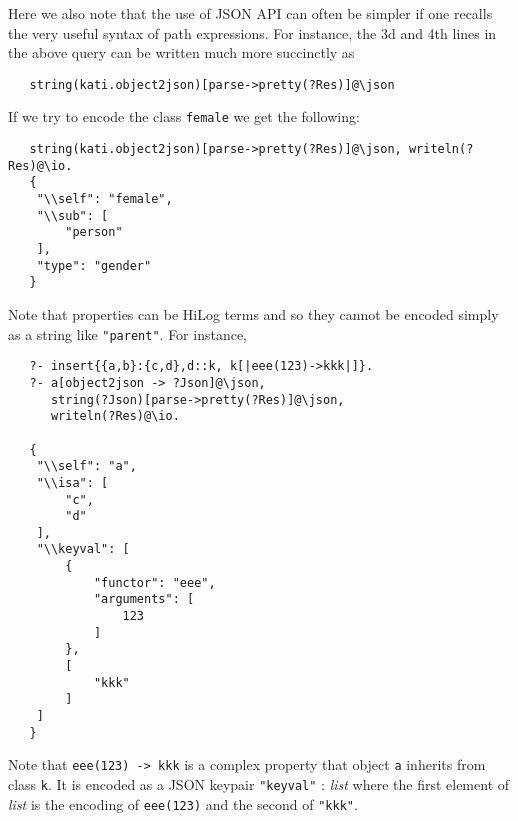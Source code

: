 Here we also note that the use of JSON API can often be simpler if one
recalls the very useful syntax of path expressions. For instance, the 3d
and 4th lines in the above query can be written much more succinctly as
\begin{verbatim}
   string(kati.object2json)[parse->pretty(?Res)]@\json
\end{verbatim}
If we try to encode the class \texttt{female} we get the following:
\begin{verbatim}
   string(kati.object2json)[parse->pretty(?Res)]@\json, writeln(?Res)@\io.
   {
    "\\self": "female",
    "\\sub": [
        "person"
    ],
    "type": "gender"
   }
\end{verbatim}
Note that \ERGO properties can be HiLog terms and so they cannot be
encoded simply as a string like \texttt{"parent"}. For instance,
\begin{verbatim}
   ?- insert{{a,b}:{c,d},d::k, k[|eee(123)->kkk|]}.
   ?- a[object2json -> ?Json]@\json,
      string(?Json)[parse->pretty(?Res)]@\json,
      writeln(?Res)@\io.

   {
    "\\self": "a",
    "\\isa": [
        "c",
        "d"
    ],
    "\\keyval": [
        {
            "functor": "eee",
            "arguments": [
                123
            ]
        },
        [
            "kkk"
        ]
    ]
   }
\end{verbatim}
Note that \texttt{eee(123) -> kkk} is a complex property that object
\texttt{a} inherits from class \texttt{k}. It is encoded as a JSON
keypair \texttt{"\bs\bs{}keyval"} : \emph{list} where the first element of
\emph{list} is the encoding of \texttt{eee(123)} and the second of
\texttt{"kkk"}.     

